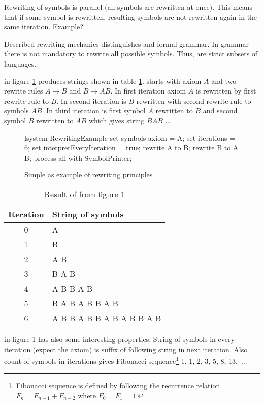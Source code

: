 Rewriting of symbols is parallel (all symbols are rewritten at once).
This means that if some symbol is rewritten, resulting symbols are not rewritten again in the same iteration.
Example?

Described rewriting mechanics distinguishes \lsystem and formal grammar.
In grammar there is not mandatory to rewrite all possible symbols.
Thus, \lsystems are strict subsets of languages.

\lsystem in figure \ref{fig:rrExample} produces strings shown in table \ref{fig:rrExampleResult}.
\lsystem starts with axiom $A$ and two rewrite rules $A \rightarrow B$ and $B \rightarrow A B$.
In first iteration axiom $A$ is rewritten by first rewrite rule to $B$.
In second iteration is $B$ rewritten with second rewrite rule to symbols $A B$.
In third iteration is first symbol $A$ rewritten to $B$ and second symbol $B$ rewritten to $A B$ which gives string $B A B$ ...

\begin{figure}[ht]
	\begin{Lsystem}
lsystem RewritingExample {
	set symbols axiom = A;
	set iterations = 6;
	set interpretEveryIteration = true;
	rewrite A to B;
	rewrite B to A B;
}
process all with SymbolPrinter;
	\end{Lsystem}
	\caption{Simple \lsystem as example of rewriting principles}
	\label{fig:rrExample}
\end{figure}

\begin{table}[ht]
	\centering
	\begin{tabular}{c l}
   		\toprule
   		Iteration & String of symbols \\
   		\midrule
		0 & A \\
		1 & B \\
		2 & A B \\
		3 & B A B \\
		4 & A B B A B \\
		5 & B A B A B B A B \\
		6 & A B B A B B A B A B B A B \\
		\bottomrule
	\end{tabular}
	\caption{Result of \lsystem from figure \ref{fig:rrExample}}
	\label{fig:rrExampleResult}
\end{table}

\lsystem in figure \ref{fig:rrExample} has also some interesting properties.
String of symbols in every iteration (expect the axiom) is suffix of following string in next iteration.
Also count of symbols in iterations gives Fibonacci sequence\footnote{Fibonacci sequence is defined by following the recurrence relation $F_n = F_{n-1} + F_{n-2}$ where $F_0 = F_1 = 1$.} 1, 1, 2, 3, 5, 8, 13,~...

